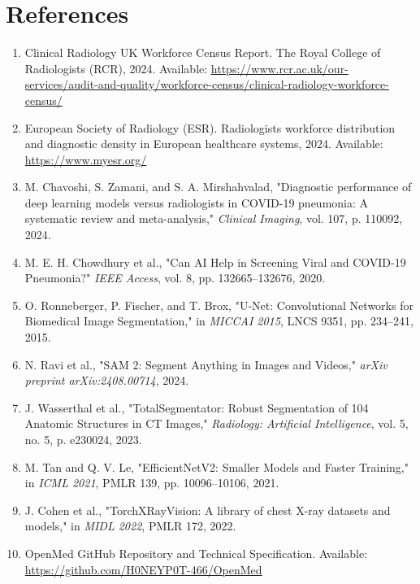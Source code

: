 \documentclass[12pt,a4paper]{report}
\begin{document}
\section*{References}
\begin{enumerate}[leftmargin=1.5em]
    \item Clinical Radiology UK Workforce Census Report. The Royal College of Radiologists (RCR), 2024. Available: \url{https://www.rcr.ac.uk/our-services/audit-and-quality/workforce-census/clinical-radiology-workforce-census/}
    \item European Society of Radiology (ESR). Radiologists workforce distribution and diagnostic density in European healthcare systems, 2024. Available: \url{https://www.myesr.org/}
    \item M. Chavoshi, S. Zamani, and S. A. Mirshahvalad, "Diagnostic performance of deep learning models versus radiologists in COVID-19 pneumonia: A systematic review and meta-analysis," \textit{Clinical Imaging}, vol. 107, p. 110092, 2024.
    \item M. E. H. Chowdhury et al., "Can AI Help in Screening Viral and COVID-19 Pneumonia?" \textit{IEEE Access}, vol. 8, pp. 132665--132676, 2020.
    \item O. Ronneberger, P. Fischer, and T. Brox, "U-Net: Convolutional Networks for Biomedical Image Segmentation," in \textit{MICCAI 2015}, LNCS 9351, pp. 234--241, 2015.
    \item N. Ravi et al., "SAM 2: Segment Anything in Images and Videos," \textit{arXiv preprint arXiv:2408.00714}, 2024.
    \item J. Wasserthal et al., "TotalSegmentator: Robust Segmentation of 104 Anatomic Structures in CT Images," \textit{Radiology: Artificial Intelligence}, vol. 5, no. 5, p. e230024, 2023.
    \item M. Tan and Q. V. Le, "EfficientNetV2: Smaller Models and Faster Training," in \textit{ICML 2021}, PMLR 139, pp. 10096--10106, 2021.
    \item J. Cohen et al., "TorchXRayVision: A library of chest X-ray datasets and models," in \textit{MIDL 2022}, PMLR 172, 2022.
    \item OpenMed GitHub Repository and Technical Specification. Available: \url{https://github.com/H0NEYP0T-466/OpenMed}
\end{enumerate}
\end{document}
